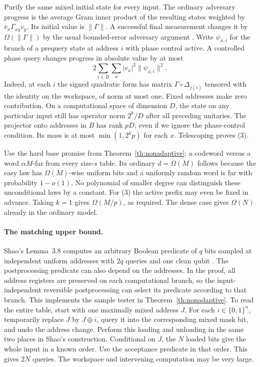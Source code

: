 Purify the same mixed initial state for every input. The ordinary adversary progress is the average Gram inner product of the resulting states weighted by $\overline v_x\Gamma_{xy}v_y$. Its initial value is $\|\Gamma\|$. A successful final measurement changes it by $\Omega(\|\Gamma\|)$ by the usual bounded-error adversary argument \cite{adv}. Write $\psi_{x,i}$ for the branch of a prequery state at address $i$ with phase control active. A controlled phase query changes progress in absolute value by at most
\[
       2\sum_{i\in B}\sum_x |v_x|^2\|\psi_{x,i}\|^2 .
\]
Indeed, at each $i$ the signed quadratic form has matrix $\Gamma\circ\Delta_{j(i)}$ tensored with the identity on the workspace, of norm at most one. Fixed addresses make zero contribution. On a computational space of dimension $D$, the state on any particular input still has operator norm $2^k/D$ after all preceding unitaries. The projector onto addresses in $B$ has rank $pD$, even if we ignore the phase-control condition. Its mass is at most $\min(1,2^kp)$ for each $x$. Telescoping proves (3).

Use the hard base promise from Theorem~\ref{th:nonadaptive}: a codeword versus a word $\alpha M$-far from every size-$s$ table. Its ordinary $d=\Omega(M)$ follows because the easy law has $\Omega(M)$-wise uniform bits and a uniformly random word is far with probability $1-o(1)$. No polynomial of smaller degree can distinguish these unconditional laws by a constant. For (3) the active prefix may even be fixed in advance. Taking $k=1$ gives $\Omega(M/p)$, as required. The dense case gives $\Omega(N)$ already in the ordinary model.

\paragraph{The matching upper bound.}
Shao's Lemma~3.8 computes an arbitrary Boolean predicate of $q$ bits sampled at independent uniform addresses with $2q$ queries and one clean qubit \cite{shao}. The postprocessing predicate can also depend on the addresses. In the proof, all address registers are preserved on each computational branch, so the input-independent reversible postprocessing can select its predicate according to that branch. This implements the sample tester in Theorem~\ref{th:nonadaptive}. To read the entire table, start with one maximally mixed address $J$. For each $i\in\{0,1\}^n$, temporarily replace $J$ by $J\oplus i$, query it into the corresponding mixed mask bit, and undo the address change. Perform this loading and unloading in the same two places in Shao's construction. Conditional on $J$, the $N$ loaded bits give the whole input in a known order. Use the acceptance predicate in that order. This gives $2N$ queries. The workspace and intervening computation may be very large.
